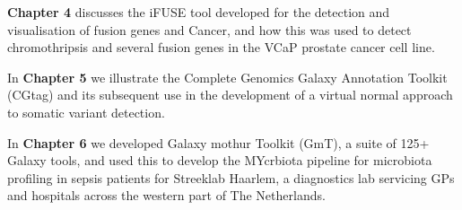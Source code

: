 \begin{justify}
\textbf{Chapter 4} discusses the iFUSE tool developed for the detection and visualisation of fusion genes and Cancer, and how this was used to detect chromothripsis and several fusion genes in the VCaP prostate cancer cell line.

In \textbf{Chapter 5} we illustrate the Complete Genomics Galaxy Annotation Toolkit (CGtag) and its subsequent use in the development of a virtual normal approach to somatic variant detection.

In \textbf{Chapter 6} we developed Galaxy mothur Toolkit (GmT), a suite of 125+ Galaxy tools, and used this to develop the MYcrbiota pipeline for microbiota profiling in sepsis patients for Streeklab Haarlem, a diagnostics lab servicing GPs and hospitals across the western part of The Netherlands.



\end{justify}



